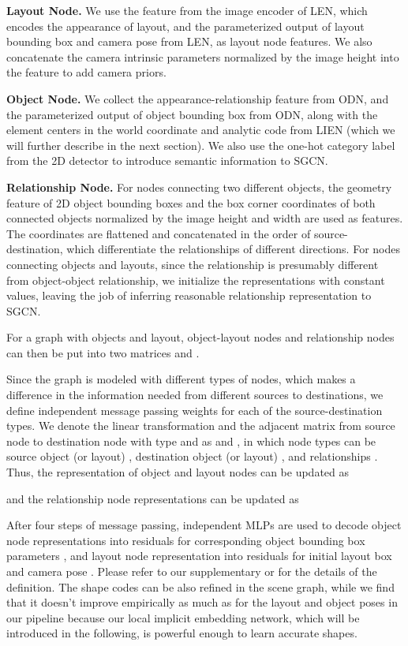\documentclass[final]{cvpr}
\begin{document}
\noindent\textbf{Layout Node.} 
We use the feature from the image encoder of LEN, which encodes the appearance of layout, and the parameterized output of layout bounding box and camera pose from LEN, as layout node features.
We also concatenate the camera intrinsic parameters normalized by the image height into the feature to add camera priors. 

\noindent\textbf{Object Node.} 
We collect the appearance-relationship feature \cite{nie2020total3dunderstanding} from ODN, and the parameterized output of object bounding box from ODN, along with the element centers in the world coordinate and analytic code from LIEN (which we will further describe in the next section). 
We also use the one-hot category label from the 2D detector to introduce semantic information to SGCN.

\noindent\textbf{Relationship Node.} 
For nodes connecting two different objects, the geometry feature \cite{hu2018relation, vaswani2017attention} of 2D object bounding boxes and the box corner coordinates of both connected objects normalized by the image height and width are used as features. The coordinates are flattened and concatenated in the order of source-destination, which differentiate the relationships of different directions.
For nodes connecting objects and layouts, since the relationship is presumably different from object-object relationship, we initialize the representations with constant values, leaving the job of inferring reasonable relationship representation to SGCN.

 
For a graph with  objects and  layout, object-layout nodes and relationship nodes can then be put into two matrices  and .

Since the graph is modeled with different types of nodes, which makes a difference in the information needed from different sources to destinations, we define independent message passing weights for each of the source-destination types.
We denote the linear transformation and the adjacent matrix from source node to destination node with type  and  as  and , in which node types can be source object (or layout) , destination object (or layout) , and relationships . 
Thus, 
the representation of object and layout nodes can be updated as

and the relationship node representations can be updated as

After four steps of message passing, independent MLPs are used to decode object node representations into residuals for corresponding object bounding box parameters , and layout node representation into residuals for initial layout box  and camera pose . Please refer to our supplementary or
\cite{nie2020total3dunderstanding} for the details of the definition.
The shape codes can be also refined in the scene graph, while we find that it doesn't improve empirically as much as for the layout and object poses in our pipeline because our local implicit embedding network, which will be introduced in the following, is powerful enough to learn accurate shapes.
\end{document}
